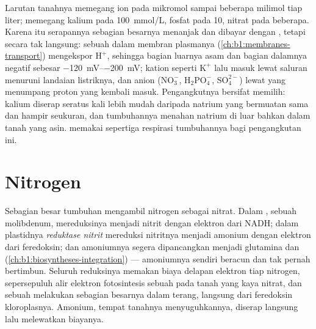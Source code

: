 \begin{proposition}\label{prop:b1:plant-water-minerals:uptake}
Larutan tanahnya memegang ion pada mikromol sampai beberapa milimol
tiap liter;   memegang kalium pada \qty{100}{mmol/L}, fosfat
pada \qty{10}{}, nitrat pada beberapa. Karena itu serapannya sebagian
besarnya menanjak dan dibayar dengan , tetapi secara tak langsung:
sebuah \emph{} dalam membran plasmanya
(\cref{ch:b1:membranes-transport}) mengekspor $\mathrm{H^+}$, sehingga
bagian luarnya asam dan bagian dalamnya negatif sebesar
\qtyrange{-120}{-200}{mV}; kation seperti $\mathrm{K^+}$ lalu masuk
lewat saluran menuruni landaian listriknya, dan anion
($\mathrm{NO_3^-}$, $\mathrm{H_2PO_4^-}$, $\mathrm{SO_4^{2-}}$) lewat
 yang menumpang proton yang kembali masuk. Pengangkutnya
bersifat memilih: kalium diserap seratus kali lebih mudah daripada
natrium yang bermuatan sama dan hampir seukuran, dan tumbuhannya
menahan natrium di luar bahkan dalam tanah yang asin.  memakai
sepertiga respirasi tumbuhannya bagi pengangkutan ini.
\end{proposition}

\section{Nitrogen}

\begin{proposition}\label{prop:b1:plant-water-minerals:nitrate}
Sebagian besar tumbuhan mengambil nitrogen sebagai nitrat. Dalam
 \emph{}, sebuah  molibdenum,
mereduksinya menjadi nitrit dengan elektron dari NADH; dalam plastidnya
\emph{reduktase nitrit} mereduksi nitritnya menjadi amonium dengan
elektron dari feredoksin; dan amoniumnya segera dipancangkan menjadi
glutamina dan  (\cref{ch:b1:biosyntheses-integration}) ---
amoniumnya sendiri beracun dan tak pernah bertimbun. Seluruh
reduksinya memakan biaya delapan elektron tiap nitrogen, sepersepuluh
alir elektron fotosintesis sebuah  pada tanah yang kaya nitrat,
dan sebuah  melakukan sebagian besarnya dalam terang, langsung
dari feredoksin kloroplasnya. Amonium, tempat tanahnya menyuguhkannya,
diserap langsung lalu melewatkan biayanya.
\end{proposition}

